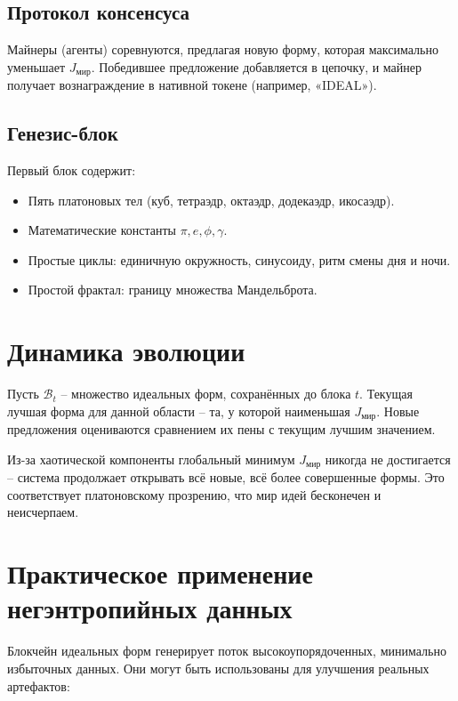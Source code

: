 \documentclass[12pt,a4paper]{article}
\begin{document}
\subsection{Протокол консенсуса}
Майнеры (агенты) соревнуются, предлагая новую форму, которая максимально уменьшает \(J_{\text{мир}}\). Победившее предложение добавляется в цепочку, и майнер получает вознаграждение в нативной токене (например, «IDEAL»).

\subsection{Генезис-блок}
Первый блок содержит:
\begin{itemize}
    \item Пять платоновых тел (куб, тетраэдр, октаэдр, додекаэдр, икосаэдр).
    \item Математические константы \(\pi, e, \phi, \gamma\).
    \item Простые циклы: единичную окружность, синусоиду, ритм смены дня и ночи.
    \item Простой фрактал: границу множества Мандельброта.
\end{itemize}

\section{Динамика эволюции}

Пусть \(\mathcal{B}_t\) – множество идеальных форм, сохранённых до блока \(t\). Текущая лучшая форма для данной области – та, у которой наименьшая \(J_{\text{мир}}\). Новые предложения оцениваются сравнением их пены с текущим лучшим значением.

Из-за хаотической компоненты глобальный минимум \(J_{\text{мир}}\) никогда не достигается – система продолжает открывать всё новые, всё более совершенные формы. Это соответствует платоновскому прозрению, что мир идей бесконечен и неисчерпаем.

\section{Практическое применение негэнтропийных данных}

Блокчейн идеальных форм генерирует поток высокоупорядоченных, минимально избыточных данных. Они могут быть использованы для улучшения реальных артефактов:
\end{document}
